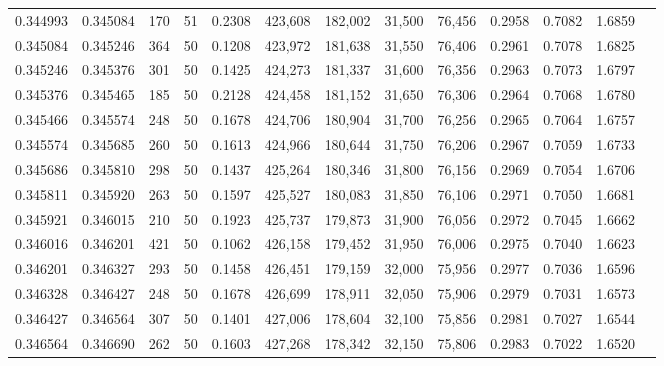 \begin{tabular}{rrrrrrrrrrrrr}
0.344993 & 0.345084 &   170 &  51 &                                     0.2308 & 423,608 & 182,002 &  31,500 &  76,456 & 0.2958 & 0.7082 & 1.6859 \\
0.345084 & 0.345246 &   364 &  50 &                                     0.1208 & 423,972 & 181,638 &  31,550 &  76,406 & 0.2961 & 0.7078 & 1.6825 \\
0.345246 & 0.345376 &   301 &  50 &                                     0.1425 & 424,273 & 181,337 &  31,600 &  76,356 & 0.2963 & 0.7073 & 1.6797 \\
0.345376 & 0.345465 &   185 &  50 &                                     0.2128 & 424,458 & 181,152 &  31,650 &  76,306 & 0.2964 & 0.7068 & 1.6780 \\
0.345466 & 0.345574 &   248 &  50 &                                     0.1678 & 424,706 & 180,904 &  31,700 &  76,256 & 0.2965 & 0.7064 & 1.6757 \\
0.345574 & 0.345685 &   260 &  50 &                                     0.1613 & 424,966 & 180,644 &  31,750 &  76,206 & 0.2967 & 0.7059 & 1.6733 \\
0.345686 & 0.345810 &   298 &  50 &                                     0.1437 & 425,264 & 180,346 &  31,800 &  76,156 & 0.2969 & 0.7054 & 1.6706 \\
0.345811 & 0.345920 &   263 &  50 &                                     0.1597 & 425,527 & 180,083 &  31,850 &  76,106 & 0.2971 & 0.7050 & 1.6681 \\
0.345921 & 0.346015 &   210 &  50 &                                     0.1923 & 425,737 & 179,873 &  31,900 &  76,056 & 0.2972 & 0.7045 & 1.6662 \\
0.346016 & 0.346201 &   421 &  50 &                                     0.1062 & 426,158 & 179,452 &  31,950 &  76,006 & 0.2975 & 0.7040 & 1.6623 \\
0.346201 & 0.346327 &   293 &  50 &                                     0.1458 & 426,451 & 179,159 &  32,000 &  75,956 & 0.2977 & 0.7036 & 1.6596 \\
0.346328 & 0.346427 &   248 &  50 &                                     0.1678 & 426,699 & 178,911 &  32,050 &  75,906 & 0.2979 & 0.7031 & 1.6573 \\
0.346427 & 0.346564 &   307 &  50 &                                     0.1401 & 427,006 & 178,604 &  32,100 &  75,856 & 0.2981 & 0.7027 & 1.6544 \\
0.346564 & 0.346690 &   262 &  50 &                                     0.1603 & 427,268 & 178,342 &  32,150 &  75,806 & 0.2983 & 0.7022 & 1.6520 \\

\end{tabular}
